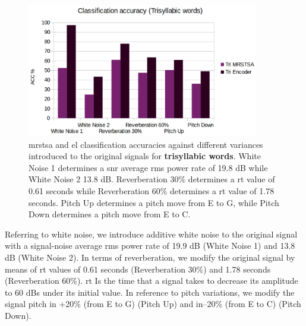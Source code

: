 \documentclass[10pt,letterpaper]{article}
\begin{document}
\begin{figure}[h!]
    \centering
    \includegraphics[width=0.9\textwidth]{TRI_ACC.png}
    \caption{\gls{mrstsa} and \gls{el} classification accuracies against different variances introduced to the original signals
    for \textbf{trisyllabic words}.
    White Noise 1 determines a \gls{snr} average \gls{rms} power rate of 19.8 dB while White Noise 2 13.8 dB.
    Reverberation 30\% determines a \gls{rt} value of 0.61 seconds while Reverberation 60\% determines a \gls{rt} value of 1.78 seconds.
    Pitch Up determines a pitch move from E to G, while Pitch Down determines a pitch move from E to C.}
    \label{fig:TRI_ACC}
\end{figure}

\pagebreak

Referring to white noise, we introduce additive white noise to the original signal with a signal-noise average \gls{rms} power
rate of 19.9 dB (White Noise 1) and 13.8 dB (White Noise 2).
In terms of reverberation, we modify the original signal by means of \gls{rt} values of 0.61 seconds (Reverberation 30\%)
and 1.78 seconds (Reverberation 60\%).
\gls{rt} Is the time that a signal takes to decrease its amplitude to 60 dBs under its initial value.
In reference to pitch variations, we modify the signal pitch in +20\% (from E to G) (Pitch Up) and in--20\% (from E to C) (Pitch Down).
\end{document}
